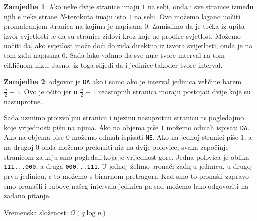 \documentclass[a4paper]{article}
\begin{document}
\textbf{Zamjedba 1}: Ako neke dvije stranice imaju $1$ na sebi, onda i sve
stranice između njih s neke strane $N$-terokuta imaju isto $1$ na sebi. Ovo
možemo lagano uočiti promatranjem stranica na kojima je napisana $0$.
Zamislimo da je točka iz upita izvor svjetlosti te da su stranice zidovi kroz
koje ne prodire svjetlost.  Možemo uočiti da, ako svjetlost može doći do zida
direktno iz izvora svijetlosti, onda je na tom zidu napisana $0$. Sada lako
vidimo da sve nule tvore interval na tom cikličnom nizu. Jasno, iz toga slijedi
da i jedinice također tvore interval.

\textbf{Zamjedba 2}: odgovor je \texttt{DA} ako i samo ako je interval jedinica
veličine barem $\frac{n}{2}+1$. Ovo je očito jer u $\frac{n}{2}+1$ uzastopnih
stranica moraju postojati dvije koje su nastuprotne.

Sada uzmimo proizvoljnu stranicu i njezinu nasuprotnu stranicu te pogledajmo
koje vrijednosti pišu na njima. Ako na objema piše $1$ možemo odmah ispisati
\texttt{DA}. Ako na objema pise $0$ možemo odmah ispisati \texttt{NE}. Ako na
jednoj stranici piše $1$, a na drugoj $0$ onda možemo prelomiti niz na dvije
polovice, svaka započinje stranicom za koju smo pogledali koja je vrijednost
gore. Jedna polovica je oblika \texttt{111...000}, a druga \texttt{000...111}.
U jednoj želimo pronaći zadnju jedinicu, u drugoj prvu jedinicu, a to možemo s
binarnom pretragom. Kad smo to pronašli zapravo smo pronašli i rubove našeg
intervala jedinica pa sad možemo lako odgovoriti na zadano pitanje.

Vremenska složenost: $\mathcal{O}(q \log n)$
\end{document}
